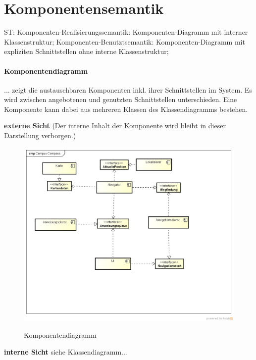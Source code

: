 \chapter{Komponentensemantik}
ST: Komponenten-Realisierungssemantik: Komponenten-Diagramm mit
interner Klassenstruktur;
Komponenten-Benutztsemantik: Komponenten-Diagramm mit expliziten
Schnittstellen ohne interne Klassenstruktur;

\subsubsection*{Komponentendiagramm}
... zeigt die austauschbaren Komponenten inkl. ihrer Schnittstellen im System. Es wird zwischen angebotenen und genutzten Schnittstellen unterschieden. Eine Komponente kann dabei aus mehreren Klassen des Klassendiagramms bestehen.

\textbf{externe Sicht}
(Der interne Inhalt der Komponente wird bleibt in dieser Darstellung verborgen.)
\begin{figure}[hbt]
  \centering
  \includegraphics[width=\linewidth]{img/komponentendiagramm.png}
  \label{img:komponentendiagramm}
  \caption{Komponentendiagramm}
\end{figure}

\textbf{interne Sicht}
siehe Klassendiagramm...